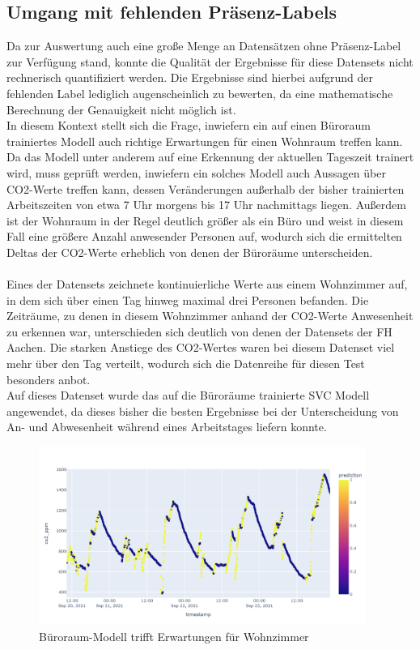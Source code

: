 \subsection{Umgang mit fehlenden Präsenz-Labels}
Da zur Auswertung auch eine große Menge an Datensätzen ohne Präsenz-Label zur Verfügung stand, konnte die 
Qualität der Ergebnisse für diese Datensets nicht rechnerisch quantifiziert werden. Die Ergebnisse
sind hierbei aufgrund der fehlenden Label lediglich augenscheinlich zu bewerten, da eine mathematische
Berechnung der Genauigkeit nicht möglich ist.\\
In diesem Kontext stellt sich die Frage, inwiefern ein auf einen Büroraum trainiertes Modell auch richtige
Erwartungen für einen Wohnraum treffen kann.
Da das Modell unter anderem auf eine Erkennung der aktuellen Tageszeit trainert wird, muss geprüft
werden, inwiefern ein solches Modell auch Aussagen über CO2-Werte treffen kann, dessen Veränderungen außerhalb
der bisher trainierten Arbeitszeiten von etwa 7 Uhr morgens bis 17 Uhr nachmittags liegen. 
Außerdem ist der Wohnraum in der Regel deutlich größer als ein Büro und weist in diesem Fall eine größere Anzahl 
anwesender Personen auf, wodurch sich die ermittelten Deltas der CO2-Werte erheblich von denen der Büroräume 
unterscheiden.\\\\
Eines der Datensets zeichnete kontinuierliche Werte aus einem Wohnzimmer auf, in dem sich über einen 
Tag hinweg maximal drei Personen befanden. Die Zeiträume, zu denen in diesem Wohnzimmer anhand der CO2-Werte
Anwesenheit zu erkennen war, unterschieden sich deutlich von denen der Datensets der FH Aachen. Die 
starken Anstiege des CO2-Wertes waren bei diesem Datenset viel mehr über den Tag verteilt, wodurch sich die 
Datenreihe für diesen Test besonders anbot.\\
Auf dieses Datenset wurde das auf die Büroräume trainierte  SVC Modell angewendet, da dieses bisher die 
besten Ergebnisse bei der Unterscheidung von An- und Abwesenheit während eines Arbeitstages liefern konnte. 

\begin{figure}[h]
    \centering
    \includegraphics[width=0.95\textwidth]{pic/h217_predicting_livingroom.png}
    \caption{Büroraum-Modell trifft Erwartungen für Wohnzimmer}
    \label{fig:pred_livingroom}
\end{figure}

